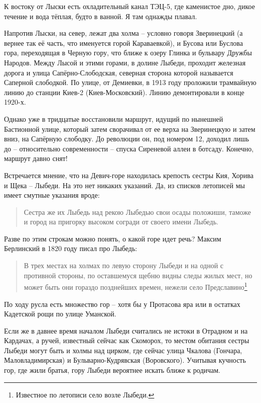 К востоку от Лыски есть охладительный канал ТЭЦ-5, где каменистое дно, дикое течение и вода тёплая, будто в ванной. Я там однажды плавал.

Напротив Лыски, на север, лежат два холма – условно говоря Зверинецкий (а вернее так её часть, что именуется горой Караваевкой), и Бусова или Буслова гора, переходящая в Черную гору, что ближе к озеру Глинка и бульвару Дружбы Народов. Между Лысой и этими горами, в долине Лыбеди, проходит железная дорога и улица Сапёрно-Слободская, северная сторона которой называется Саперной слободкой. По улице, от Демиевки, в 1913 году проложили трамвайную линию до станции Киев-2 (Киев-Московский). Линию демонтировали в конце 1920-х.

Однако уже в тридцатые восстановили маршрут, идущий по нынешней Бастионной улице, который затем сворачивал от ее верха на Зверинецкую и затем вниз, на Сапёрную слободку. До революции он, под номером 12, доходил лишь до – относительно современности – спуска Сиреневой аллеи в ботсаду. Конечно, маршрут давно снят!

Встречается мнение, что на Девич-горе находилась крепость сестры Кия, Хорива и Щека – Лыбеди. На это нет никаких указаний. Да, из списков летописей мы имеет смутные указания вроде:

\begin{quotation}
Сестра же их Лыбедь над рекою Лыбедью свои осады положиши, таможе и город на пригорку высоком согради от своего имени Лыбедь.\end{quotation}

Разве по этим строкам можно понять, о какой горе идет речь? Максим Берлинский в 1820 году писал про Лыбедь:

\begin{quotation}
В трех местах на холмах по левую сторону Лыбеди и на одной с противной стороны, по оставшемуся щебню видны следы жилых мест, но может быть они гораздо позднейших времен, нежели село Предславино\footnote{Известное по летописи село возле Лыбеди.}
\end{quotation}

По ходу русла есть множество гор – хотя бы у Протасова яра или в остатках Кадетской рощи по улице Уманской.

Если же в давнее время началом Лыбеди считались не истоки в Отрадном и на Кардачах, а ручей, известный сейчас как Скоморох, то местом обитания сестры Лыбеди могут быть и холмы над цирком, где сейчас улица Чкалова (Гончара, Маловладимирская) и Бульварно-Кудрявская (Воровского). Учитывая кучность гор, где жили братья, гору Лыбеди вероятнее искать ближе к родичам.

